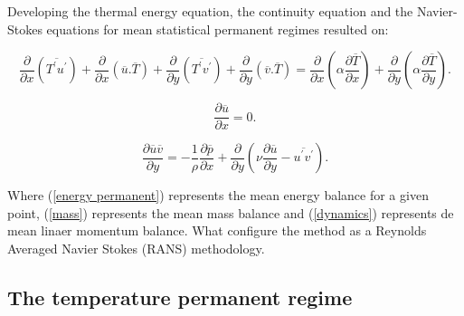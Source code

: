 \documentclass[10pt]{article} %
\begin{document}
Developing the thermal energy equation, the continuity equation and the Navier-Stokes equations for mean statistical permanent regimes resulted on: 


\begin{equation}\label{energy permanent}
\frac{\partial{}}{\partial{x}} \left(\overline{T^\prime u^\prime}\right) + \frac{\partial{}}{\partial{x}}\left(\overline{u}.\overline{T}\right)     + 
\frac{\partial{}}{\partial{y}} \left(\overline{T^\prime v^\prime}\right) + \frac{\partial{}}{\partial{y}}\left(\overline{v}.\overline{T}\right) 
=
{\frac{\partial{}}{\partial{x}}} \left(\alpha {\frac{\partial{\overline{T}}}{\partial{x}}} \right) +
{\frac{\partial{}}{\partial{y}}} \left(\alpha {\frac{\partial{\overline{T}}}{\partial{y}}} \right). 
\end{equation}

\begin{equation}\label{mass}
\frac{\partial \overline{u}}{\partial x} = 0.
\end{equation}

\begin{equation}\label{dynamics}
\frac{\partial \overline{u}\overline{v}}{\partial y} = 
- \frac{1}{\rho} \frac{\partial \overline{p}}{\partial x} + \frac{\partial}{\partial y}\left(\nu \frac{\partial \overline{u}}{\partial y} - \overline{u^\prime v^\prime}\right).
\end{equation}

Where (\ref{energy permanent}) represents the mean energy balance for a given point, (\ref{mass}) represents the mean mass balance and (\ref{dynamics}) represents de mean linaer momentum balance. What configure the method as a Reynolds Averaged Navier Stokes (RANS) methodology.

\subsection{The temperature permanent regime}
\end{document}
